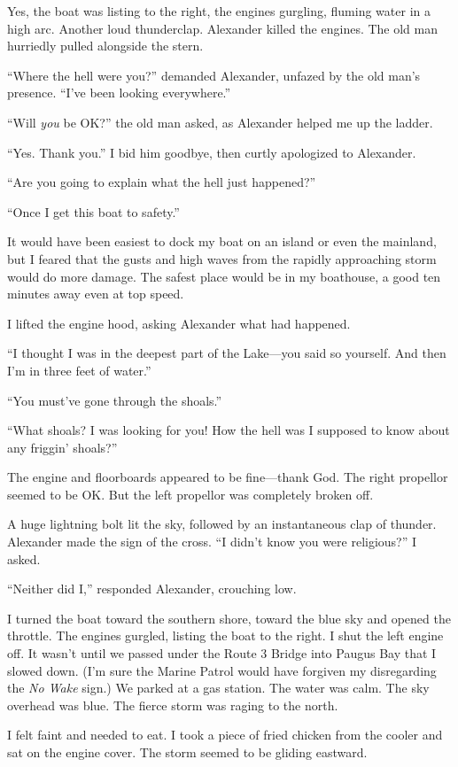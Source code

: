 Yes, the boat was listing to the right, the engines gurgling, fluming
water in a high arc. Another loud thunderclap. Alexander killed the
engines. The old man hurriedly pulled alongside the stern.

``Where the hell were you?'' demanded Alexander, unfazed by the old
man's presence. ``I've been looking everywhere.''

``Will \emph{you} be OK?'' the old man asked, as Alexander helped me up
the ladder.

``Yes. Thank you.'' I bid him goodbye, then curtly apologized to
Alexander.

``Are you going to explain what the hell just happened?''

``Once I get this boat to safety.''

It would have been easiest to dock my boat on an island or even the
mainland, but I feared that the gusts and high waves from the rapidly
approaching storm would do more damage. The safest place would be in my
boathouse, a good ten minutes away even at top speed.

I lifted the engine hood, asking Alexander what had happened.

``I thought I was in the deepest part of the Lake---you said so
yourself. And then I'm in three feet of water.''

``You must've gone through the shoals.''

``What shoals? I was looking for you! How the hell was I supposed to
know about any friggin' shoals?''

The engine and floorboards appeared to be fine---thank God. The right
propellor seemed to be OK. But the left propellor was completely broken
off.

A huge lightning bolt lit the sky, followed by an instantaneous clap of
thunder. Alexander made the sign of the cross. ``I didn't know you were
religious?'' I asked.

``Neither did I,'' responded Alexander, crouching low.

I turned the boat toward the southern shore, toward the blue sky and
opened the throttle. The engines gurgled, listing the boat to the right.
I shut the left engine off. It wasn't until we passed under the Route 3
Bridge into Paugus Bay that I slowed down. (I'm sure the Marine Patrol
would have forgiven my disregarding the \emph{No Wake} sign.) We parked
at a gas station. The water was calm. The sky overhead was blue. The
fierce storm was raging to the north.

I felt faint and needed to eat. I took a piece of fried chicken from the
cooler and sat on the engine cover. The storm seemed to be gliding
eastward.


